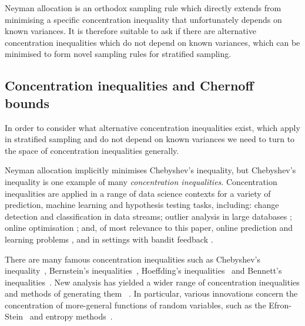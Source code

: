 Neyman allocation is an orthodox sampling rule which directly extends from minimising a specific concentration inequality that unfortunately depends on known variances.
It is therefore suitable to ask if there are alternative concentration inequalities which do not depend on known variances, which can be minimised to form novel sampling rules for stratified sampling.




\subsection{Concentration inequalities and Chernoff bounds}

In order to consider what alternative concentration inequalities exist, which apply in stratified sampling and do not depend on known variances we need to turn to the space of concentration inequalities generally. 

Neyman allocation implicitly minimises Chebyshev's inequality, but Chebyshev's inequality is one example of many \textit{concentration inequalities}.
Concentration inequalities are applied in a range of data science contexts for a variety of prediction, machine learning and hypothesis testing tasks, including:
change detection \citep{KiferShaiGehrke2004,8000571} 
and classification \citep{Zia-UrRehman2012} in data streams;
outlier analysis in large databases \citep{Aggarwal2015};
online optimisation \citep{FlaxmanKalaiMcMahan2005,AgarwalDekelXiao2010}; and, of most relevance to this paper, 
online prediction and learning problems \citep{%
Mnih:2008:EBS:1390156.1390241,DBLP:conf/aaai/ThomasTG15,Maurer50empiricalbernstein},
and in settings with bandit feedback \citep{AuerCesa-BianchiEtal_SIAM2003,AudibertBubeck_COLT2009,Tran-ThanhChapmanRJ_AAAI2009}.

There are many famous concentration inequalities such as Chebyshev's inequality~\citep{Chebyshev1}, Bernstein's inequalities~\citep{Burnstein1}, 
Hoeffding's inequalities~\citep{hoeffding1} and Bennett's inequalities~\citep{10.2307/2282438}.
New analysis has yielded a wider range of concentration inequalities and methods of generating them ~\citep{MR3363542,Boucheron2004}. 
In particular, various innovations concern the concentration of more-general functions of random variables, such as 
the Efron-Stein~\citep{efron1981} and 
entropy methods~\citep{Boucheron_concentrationinequalities}.%

